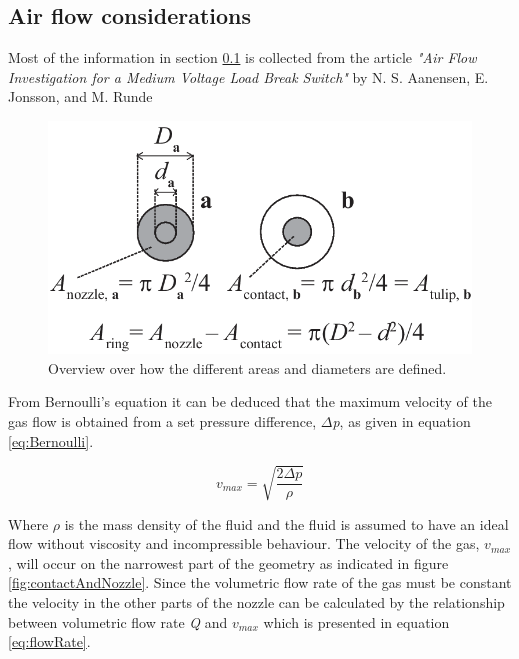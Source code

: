 \documentclass[10pt,a4paper]{article}
\begin{document}
\newpage

\subsection{Air flow considerations} \label{sec:AirFlow}
 Most of the information in section \ref{sec:AirFlow} is collected from the article \textit{"Air Flow Investigation for a Medium Voltage Load Break Switch"} by N. S. Aanensen, E. Jonsson, and M. Runde \newline

\begin{figure} [h]
\centering
\includegraphics[scale=0.3]{Bilder/Theory/kontaktoversiktAnders.png}
\caption{Overview over how the different areas and diameters are defined.} \label{fig:AreacontactAndNozzle}
\end{figure}

From Bernoulli's equation it can be deduced that the maximum velocity of the gas flow is obtained from a set pressure difference, $\Delta$\textit{p}, as given in equation \eqref{eq:Bernoulli}.

\begin{equation} \label{eq:Bernoulli}
v_{max}=\sqrt{ \frac{2 \Delta p}{\rho}}
\end{equation}

Where $\rho$ is the mass density of the fluid and the fluid is assumed to have an ideal flow without viscosity and incompressible behaviour. The velocity of the gas, $v_{max}$, will occur on the narrowest part of the geometry as indicated in figure \ref{fig:contactAndNozzle}. Since the volumetric flow rate of the gas must be constant the velocity in the other parts of the nozzle can be calculated by the relationship between volumetric flow rate \textit{Q} and $v_{max}$ which is presented in equation \eqref{eq:flowRate}.
\end{document}
